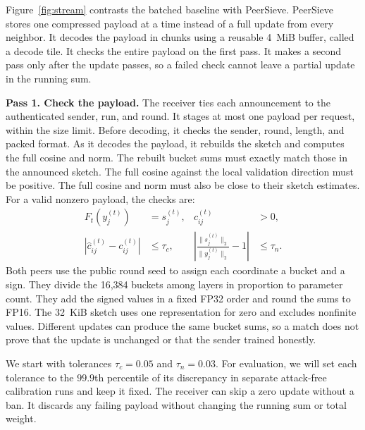 \documentclass{article}
\begin{document}
Figure~\ref{fig:stream} contrasts the batched baseline with PeerSieve. PeerSieve stores one compressed payload at a time instead of a full update from every neighbor. It decodes the payload in chunks using a reusable 4~MiB buffer, called a decode tile. It checks the entire payload on the first pass. It makes a second pass only after the update passes, so a failed check cannot leave a partial update in the running sum.

\textbf{Pass 1. Check the payload.} The receiver ties each announcement to the authenticated sender, run, and round. It stages at most one payload per request, within the size limit. Before decoding, it checks the sender, round, length, and packed format. As it decodes the payload, it rebuilds the sketch and computes the full cosine and norm. The rebuilt bucket sums must exactly match those in the announced sketch. The full cosine against the local validation direction must be positive. The full cosine and norm must also be close to their sketch estimates. For a valid nonzero payload, the checks are:
\begin{equation}
\begin{aligned}
  F_t(y_j^{(t)}) &= s_j^{(t)}, & c_{ij}^{(t)} &> 0, \\
  |\widehat c_{ij}^{(t)}-c_{ij}^{(t)}| &\le \tau_c, &
  \left|\frac{\|s_j^{(t)}\|_2}{\|y_j^{(t)}\|_2}-1\right| &\le \tau_n .
\end{aligned}
\label{eq:audit}
\end{equation}
Both peers use the public round seed to assign each coordinate a bucket and a sign. They divide the 16,384 buckets among layers in proportion to parameter count. They add the signed values in a fixed FP32 order and round the sums to FP16. The 32~KiB sketch uses one representation for zero and excludes nonfinite values. Different updates can produce the same bucket sums, so a match does not prove that the update is unchanged or that the sender trained honestly.

We start with tolerances $\tau_c=0.05$ and $\tau_n=0.03$. For evaluation, we will set each tolerance to the $99.9$th percentile of its discrepancy in separate attack-free calibration runs and keep it fixed. The receiver can skip a zero update without a ban. It discards any failing payload without changing the running sum or total weight.
\end{document}

